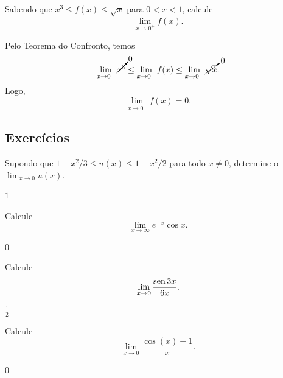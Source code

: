 
\begin{exeresol}
  Sabendo que $x^3 \leq f(x) \leq \sqrt{x}$ para $0 < x < 1$, calcule
  \begin{equation}
    \lim_{x\to 0^+} f(x).
  \end{equation}
\end{exeresol}
\begin{resol}
  Pelo Teorema do Confronto, temos
  \begin{equation}
    \lim_{x\to 0^+} \cancelto{0}{x^3} \leq \lim_{x\to 0^+} f(x) \leq \lim_{x\to 0^+} \cancelto{0}{\sqrt{x}}.
  \end{equation}
  Logo,
  \begin{equation}
    \lim_{x\to 0^+} f(x) = 0.
  \end{equation}
\end{resol}


\subsection{Exercícios}


\begin{exer}
  Supondo que $1-x^2/3 \leq u(x) \leq 1-x^2/2$ para todo $x\neq 0$, determine o $\lim_{x\to 0} u(x)$.
\end{exer}
\begin{resp}
  $1$
\end{resp}

\begin{exer}
  Calcule
  \begin{equation}
    \lim_{x\to \infty} e^{-x}\cos x.
  \end{equation}
\end{exer}
\begin{resp}
  $0$
\end{resp}

\begin{exer}
  Calcule
  \begin{equation}
    \lim_{x\to 0} \frac{\operatorname{sen} 3x}{6x}.
  \end{equation}
\end{exer}
\begin{resp}
  $\frac{1}{2}$
\end{resp}

\begin{exer}\label{exer:lim_cosx_1}
  Calcule
  \begin{equation}
    \lim_{x\to 0} \frac{\cos(x)-1}{x}.
  \end{equation}
\end{exer}
\begin{resp}
  $0$
\end{resp}

